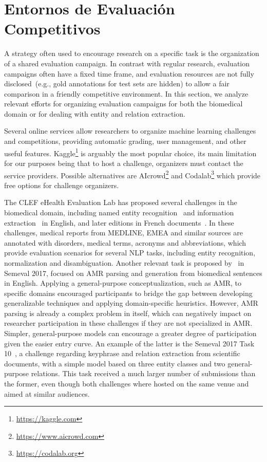   \section{Entornos de Evaluación Competitivos}

  A strategy often used to encourage research on a specific task is the organization of a shared
  evaluation campaign. In contrast with regular research, evaluation campaigns often have a fixed
  time frame, and evaluation resources are not fully disclosed~(e.g., gold annotations for
  test sets are hidden) to allow a fair comparison in a friendly competitive environment.
  In this section, we analyze relevant efforts for organizing evaluation campaigns for both the biomedical domain or for dealing with entity and relation extraction.

  Several online services allow researchers to organize machine learning challenges and competitions, providing automatic grading, user management, and other useful features.
  Kaggle\footnote{\url{https://kaggle.com}} is arguably the most popular choice, its main limitation for our purposes being that to host a challenge, organizers must contact the service providers. Possible alternatives are AIcrowd\footnote{\url{https://www.aicrowd.com}} and
  Codalab\footnote{\url{https://codalab.org}} which provide free options for challenge organizers.

  The CLEF eHealth Evaluation Lab has proposed several challenges in the biomedical domain, including
  named entity recognition~\cite{clef2013} and information extraction~\cite{clef2014} in English,
  and later editions in French documents~\cite{clef2015, clef2016}.
  In these challenges, medical reports from MEDLINE, EMEA and similar sources are annotated with disorders, medical terms, acronyms and abbreviations, which provide evaluation scenarios
  for several NLP tasks, including entity recognition, normalization and disambiguation.
  Another relevant task is proposed by~\citet{semeval2017-task9} in Semeval 2017, focused on AMR parsing and generation from biomedical
  sentences in English. Applying a general-purpose conceptualization, such as AMR, to specific domains encouraged participants to bridge the gap between developing generalizable techniques and applying domain-specific heuristics.
  However, AMR parsing is already a complex problem in itself, which can negatively impact on researcher participation in these challenges if they are not specialized in AMR.
  Simpler, general-purpose models can encourage a greater degree of participation given the easier entry curve.
  An example of the latter is the Semeval 2017 Task 10~\cite{semeval2017-task10},
  a challenge regarding keyphrase and relation extraction from scientific documents,
  with a simple model based on three entity classes and two general-purpose relations.
  This task received a much larger number of submissions than the former, even though both challenges where hosted on the same venue and aimed at similar audiences.

